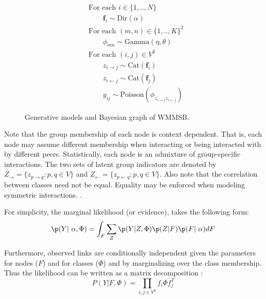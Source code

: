 \begin{figure}[h]
    \hspace*{-3.7em}
\begin{minipage}[h]{0.3\linewidth}
\begin{align*}
	&\textrm{For each } i \in \{1, .., N\}  \\
	&\qquad\bm{f}_i \sim \textrm{Dir}(\alpha)\\
	&\textrm{For each }  (m,n) \in \{1,..,K\}^2 \\
	&\qquad\phi_{mn} \sim \mathrm{Gamma}(\eta,\theta)\\
	&\textrm{For each } (i,j) \in V^2 \\
	&\qquad z_{i \rightarrow j} \sim \mbox{Cat}(\bm{f}_i)\\
	&\qquad z_{i \leftarrow j} \sim \mbox{Cat}(\bm{f}_j)\\
    &\qquad y_{ij} \sim \mathrm{Poisson}(\phi_{z_{i \rightarrow j}z_{i \leftarrow j}})
\end{align*}
\end{minipage}
\begin{minipage}[h]{0.3\linewidth}
	\scalebox{0.88}{}
\end{minipage}
    \caption{Generative models and Bayesian graph of WMMSB.}
\end{figure}

Note that the group membership of each node is context dependent. That is, each node may assume different membership when interacting or being interacted with by different peers. Statistically, each node is an admixture of group-specific interactions. The two sets of latent group indicators are denoted by $Z_\rightarrow = \{z_{p\rightarrow q} : p, q \in V\}$ and $Z_\leftarrow = \{z_{p\leftarrow q} : p, q \in V\}$. Also note that the correlation between classes need not be equal. Equality may be enforced when modeling symmetric interactions. \cite{goldenberg2010survey}.


For simplicity, the marginal likelihood (or evidence), takes the following form:
\begin{equation*}
    \p(Y | \alpha, \Phi) = \int_F \sum_Z \p(Y| Z, \Phi) \p(Z|F) \p(F| \alpha) dF
\end{equation*}

Furthermore, observed links are conditionally independent given the parameters for nodes ($F$) and for classes ($\Phi$) and by marginalizing over the class membership. Thus the likelihood can be written as a matrix decomposition :
\begin{equation*}
P(Y | F, \Phi) = \prod_{i,j \in V^2} f_i \Phi f_j^T
\end{equation*} 

